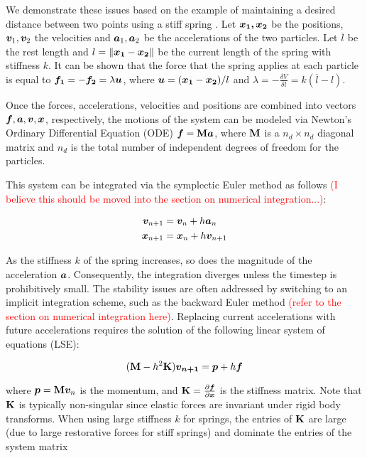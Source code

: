 We demonstrate these issues based on the example of maintaining a desired distance between two points using a stiff 
spring \cite{tournier2015}. Let $\bm{x_1, x_2}$ be the positions, $\bm{v}_1, \bm{v}_2$ the velocities and $\bm{a}_1, \bm{a}_2$
be the accelerations of the two particles. Let $\overline{l}$ be the rest length and $l = \lVert \bm{x_1} - \bm{x_2} \rVert$ 
be the current length of the spring with stiffness $k$. It can be shown that the force that the spring applies at each particle
is equal to $\bm{f_1} = -\bm{f_2} = \lambda\bm{u}$, where $\bm{u} = (\bm{x_1} - \bm{x_2}) / l$
and $\lambda = -\frac{\delta V}{\delta l} = k(\overline{l} - l)$. 

Once the forces, accelerations, velocities and positions are combined into vectors $\bm{f}, \bm{a}, \bm{v}, \bm{x}$, 
respectively, the motions of the system can be modeled via Newton's Ordinary Differential Equation (ODE) $\bm{f} = \mathbf{M}\bm{a}$,
where $\mathbf{M}$ is a $n_d \times n_d$ diagonal matrix and $n_d$ is the total number of independent degrees of freedom for the 
particles.

This system can be integrated via the symplectic Euler method as follows \textcolor{red}{(I believe this should be moved into
the section on numerical integration...)}:

\begin{align*}
    \bm{v}_{n+1} &= \bm{v}_n + h\bm{a}_n \\
    \bm{x}_{n+1} &= \bm{x}_n + h\bm{v}_{n+1}
\end{align*}

As the stiffness $k$ of the spring increases, so does the magnitude of the acceleration $\bm{a}$. Consequently, the integration
diverges unless the timestep is prohibitively small. The stability issues are often addressed by switching to an implicit 
integration scheme, such as the backward Euler method \cite{baraff1998} \textcolor{red}{(refer to the section on numerical 
integration here)}. Replacing current accelerations with future accelerations requires the solution of the following linear 
system of equations (LSE):

\[
    (\mathbf{M} - h^2\mathbf{K})\bm{v_{n+1}} = \bm{p} + h\bm{f}
\]

where $\bm{p} = \mathbf{M}\bm{v}_n$ is the momentum, and $\mathbf{K} = \frac{\partial \bm{f}}{\partial \bm{x}}$ is the 
stiffness matrix. Note that 
$\mathbf{K}$ is typically non-singular since elastic forces are invariant under rigid body transforms. When using large stiffness 
$k$ for springs, the entries of $\mathbf{K}$ are large (due to large restorative forces for stiff springs) and dominate the entries 
of the system matrix 


